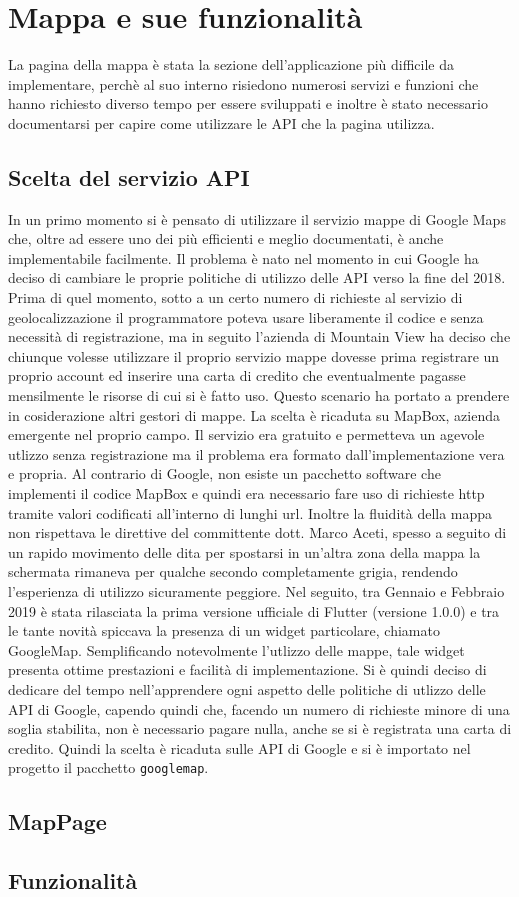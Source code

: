 \section{Mappa e sue funzionalità}
La pagina della mappa è stata la sezione dell'applicazione più difficile da
implementare, perchè al suo interno risiedono numerosi servizi e funzioni che
hanno richiesto diverso tempo per essere sviluppati e inoltre è stato necessario
documentarsi per capire come utilizzare le API che la pagina utilizza.

\subsection{Scelta del servizio API}
In un primo momento si è pensato di utilizzare il servizio mappe di Google Maps
che, oltre ad essere uno dei più efficienti e meglio documentati, è anche
implementabile facilmente. Il problema è nato nel momento in cui Google ha
deciso di cambiare le proprie politiche di utilizzo delle API verso la fine del
2018. Prima di quel momento, sotto a un certo numero di richieste al servizio di
geolocalizzazione il programmatore poteva usare liberamente il codice e senza
necessità di registrazione, ma in seguito l'azienda di Mountain View ha deciso
che chiunque volesse utilizzare il proprio servizio mappe dovesse prima
registrare un proprio account ed inserire una carta di credito che eventualmente
pagasse mensilmente le risorse di cui si è fatto uso. Questo scenario ha portato
a prendere in cosiderazione altri gestori di mappe. La scelta è ricaduta su
MapBox, azienda emergente nel proprio campo. Il servizio era gratuito e permetteva
un agevole utlizzo senza registrazione ma il problema era formato
dall'implementazione vera e propria. Al contrario di Google, non esiste un
pacchetto software che implementi il codice MapBox e quindi era necessario fare
uso di richieste http tramite valori codificati all'interno di lunghi url.
Inoltre la fluidità della mappa non rispettava le direttive del committente
dott. Marco Aceti, spesso a seguito di un rapido movimento delle dita per
spostarsi in un'altra zona della mappa la schermata rimaneva per qualche secondo
completamente grigia, rendendo l'esperienza di utilizzo sicuramente peggiore.
Nel seguito, tra Gennaio e Febbraio 2019 è stata rilasciata la prima versione
ufficiale di Flutter (versione 1.0.0) e tra le tante novità spiccava la presenza
di un widget particolare, chiamato GoogleMap. Semplificando notevolmente
l'utlizzo delle mappe, tale widget presenta ottime prestazioni e facilità di
implementazione. Si è quindi deciso di dedicare del tempo nell'apprendere ogni
aspetto delle politiche di utlizzo delle API di Google, capendo quindi che,
facendo un numero di richieste minore di una soglia stabilita, non è necessario
pagare nulla, anche se si è registrata una carta di credito. Quindi la scelta è
ricaduta sulle API di Google e si è importato nel progetto il pacchetto
\verb|googlemap|.

\subsection{MapPage}

\subsection{Funzionalità}

